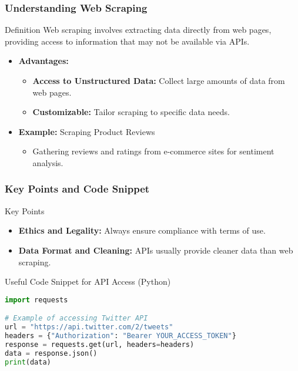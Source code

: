 \documentclass{beamer}
\begin{document}
\begin{frame}[fragile]
    \frametitle{Understanding Web Scraping}
    \begin{block}{Definition}
        Web scraping involves extracting data directly from web pages, providing access to information that may not be available via APIs.
    \end{block}

    \begin{itemize}
        \item \textbf{Advantages:}
        \begin{itemize}
            \item \textbf{Access to Unstructured Data:} Collect large amounts of data from web pages.
            \item \textbf{Customizable:} Tailor scraping to specific data needs.
        \end{itemize}
        
        \item \textbf{Example:} Scraping Product Reviews
        \begin{itemize}
            \item Gathering reviews and ratings from e-commerce sites for sentiment analysis.
        \end{itemize}
    \end{itemize}
\end{frame}

\begin{frame}[fragile]
    \frametitle{Key Points and Code Snippet}
    \begin{block}{Key Points}
        \begin{itemize}
            \item \textbf{Ethics and Legality:} Always ensure compliance with terms of use.
            \item \textbf{Data Format and Cleaning:} APIs usually provide cleaner data than web scraping.
        \end{itemize}
    \end{block}

    \begin{block}{Useful Code Snippet for API Access (Python)}
    \begin{lstlisting}[language=Python]
import requests

# Example of accessing Twitter API
url = "https://api.twitter.com/2/tweets"
headers = {"Authorization": "Bearer YOUR_ACCESS_TOKEN"}
response = requests.get(url, headers=headers)
data = response.json()
print(data)
    \end{lstlisting}
    \end{block}
\end{frame}
\end{document}
